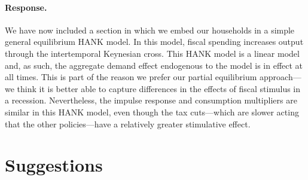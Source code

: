 \documentclass[12pt,letterpaper,english]{article}
\begin{document}
\begin{enumerate}
	\paragraph{Response.} We have now included a section in which we embed our households in a simple general equilibrium HANK model. In this model, fiscal spending increases output through the intertemporal Keynesian cross. This HANK model is a linear model and, as such, the aggregate demand effect endogenous to the model is in effect at all times. This is part of the reason we prefer our partial equilibrium approach---we think it is better able to capture differences in the effects of fiscal stimulus in a recession. Nevertheless, the impulse response and consumption multipliers are similar in this HANK model, even though the tax cuts---which are slower acting that the other policies---have a relatively greater stimulative effect.

\end{enumerate}

\section{Suggestions}
\end{document}
